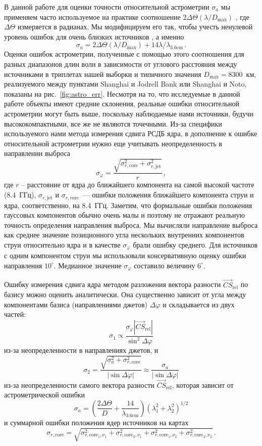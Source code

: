 В данной работе для оценки точности относительной астрометрии $\sigma_a$ мы применяем часто
используемое на практике соотношение $2\Delta\Theta(\lambda/D_\textrm{max})$ \cite{Reid14}, где
$\Delta\Theta$ измеряется в радианах. Мы модифицируем его так, чтобы учесть ненулевой уровень ошибок
для очень близких источников \cite{Pradel06}, а именно
$$
\sigma_a = 2\Delta\Theta(\lambda/D_\textrm{max}) + 14 \lambda/\lambda_{\textrm{3.6cm}}\,.
$$
\noindent
Оценки ошибок астрометрии, полученные с помощью этого соотношения для разных
диапазонов длин волн в зависимости от углового расстояния между источниками
в триплетах нашей выборки и типичного значения $D_\textrm{max}=8300$~км,
реализуемого между пунктами Shanghai и Jodrell Bank или Shanghai и Noto, показаны
на рис.~\ref{fig:astro_err}. Несмотря на то, что исследуемые в данной работе
объекты имеют средние склонения, реальные ошибки относительной астрометрии
могут быть выше, поскольку наблюдаемые нами источники, будучи высококомпактными,
все же не являются точечными. Из-за специфики используемого нами метода
измерения сдвига РСДБ ядра, в дополнение к ошибке относительной астрометрии нужно еще учитывать
неопределенность в направлении выброса
$$
\sigma_\varphi = \frac{\sqrt{\sigma_{r,\textrm{core}}^2 + \sigma_{r,\textrm{jet}}^2}}{r}\,,
$$
\noindent
где $r$ -- расстояние от ядра до ближайшего компонента на самой высокой частоте (8.4~ГГц),
$\sigma_{r,\textrm{jet}}$ и $\sigma_{r,\textrm{core}}$~--- ошибки положения ближайшего компонента
струи и ядра, соответственно, на 8.4~ГГц. Заметим, что формальные ошибки положения гауссовых
компонентов обычно очень малы и поэтому не отражают реальную точность определения
направления выброса. Мы вычисляли направление выброса как среднее значение позиционного угла
нескольких внутренних компонентов струи относительно ядра и в качестве $\sigma_\varphi$ брали ошибку
среднего. Для источников с одним компонентом струи мы использовали консервативную оценку ошибки
направления $10^\circ$. Медианное значение $\sigma_\varphi$ составило величину $6^\circ$.

Ошибку измерения сдвига ядра методом разложения вектора разности $\vec{CS}_{\mathrm{rel}}$
по базису можно оценить аналитически. Она существенно зависит от угла между компонентами
базиса (направлениями джетов) $\Delta \varphi$ и складывается из двух частей:
$$
\sigma_1 \propto \frac{\sigma_\varphi|\vec{CS}_{\mathrm{rel}}|}{\sin^2 \Delta \varphi}
$$
из-за неопределенности в направлениях джетов, и
$$
\sigma_2 = \frac{\sqrt{\sigma_a^2+\sigma_{r,\mathrm{core}}^2}}{|\sin\Delta \varphi|} \approx
\frac{\sigma_a}{|\sin \Delta \varphi|}
$$
из-за неопределенности самого вектора разности $\vec{CS}_{\mathrm{rel}}$, которая зависит от
астрометрической ошибки
$$
\sigma_a= \left(\frac{2\Delta\Theta}{D} + \frac{14}{\lambda_{\mathrm{3.6cm}}}\right)
\left(\lambda_1^2 + \lambda_2^2\right)^{1/2}
$$
и суммарной ошибки положения ядер источников на картах
$$
\sigma_{r,\mathrm{core}} = \sqrt{\sigma_{r,\textrm{core}_1,\nu_1}^2 +
\sigma_{r,\textrm{core}_2,\nu_1}^2 + \sigma_{r,\textrm{core}_1,\nu_2}^2 +
\sigma_{r,\textrm{core}_2,\nu_2}^2} \,.
$$

